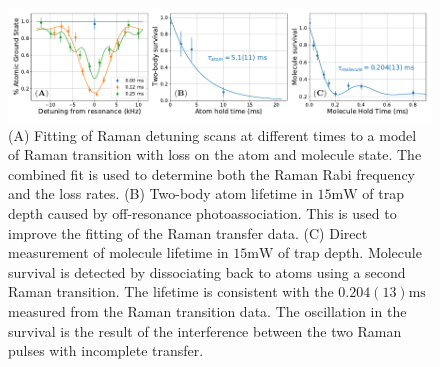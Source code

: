 \documentclass[aps,prl,twocolumn,superscriptaddress]{revtex4-1}
\newcommand{\todo}[1]{}
\begin{document}

\begin{figure}[t!]
  \includegraphics[width=\textwidth]{fig3.pdf}
  \caption{
    (A) Fitting of Raman detuning scans at different times to a model of Raman transition
    with loss on the atom and molecule state. The combined fit is used to determine
    both the Raman Rabi frequency and the loss rates.
    (B) \todo{inset?} Two-body atom lifetime in $15 \mathrm{mW}$ of trap depth caused by
    off-resonance photoassociation.
    This is used to improve the fitting of the Raman transfer data.
    (C) Direct measurement of molecule lifetime in $15 \mathrm{mW}$ of trap depth.
    Molecule survival is detected by dissociating back to atoms using a second Raman transition.
    The lifetime is consistent with the $0.204(13) \mathrm{ms}$
    measured from the Raman transition data.
    The oscillation in the survival is the result of the interference
    between the two Raman pulses with incomplete transfer.
    \label{f-lifetime}}
\end{figure}

\end{document}
